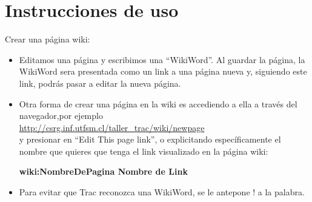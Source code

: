 \documentclass[letter, 10pt]{article}
\begin{document}
\section{Instrucciones de uso}
Crear una página wiki:
  \begin{itemize}
	\item Editamos una página y escribimos una ``WikiWord''. Al guardar la página, la WikiWord sera presentada como un link a una página nueva y, siguiendo este link, podrás pasar a editar la nueva página.
	\item Otra forma de crear una página en la wiki es accediendo a ella a
    través del navegador,por ejemplo\\
    \url{http://csrg.inf.utfsm.cl/taller_trac/wiki/newpage}\\ y presionar en
    ``Edit This page link'', o explicitando específicamente el nombre que
    quieres que tenga el link visualizado en la página wiki:
		\begin{center}\textbf{\lbrack wiki:NombreDePagina Nombre de Link\rbrack}\end{center}
	\item Para evitar que Trac reconozca una WikiWord, se le antepone ! a la palabra.
  \end{itemize}
\end{document}
